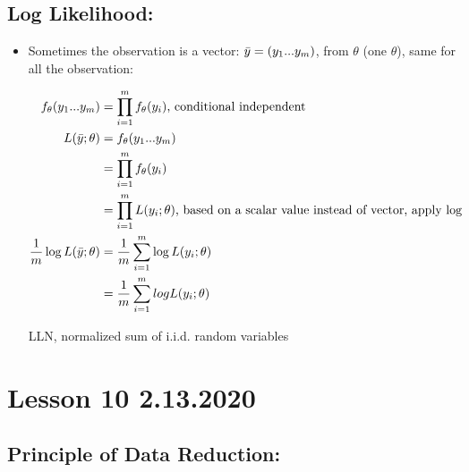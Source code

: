 \documentclass[11pt,letterpaper,titlepage]{article}
\begin{document}
\subsection{Log Likelihood:}

\begin{itemize}
    
    \item Sometimes the observation is a vector: $\Bar{y} = (y_1...y_m)$, from $\theta$ (one $\theta$), same for all the observation:
    
    \begin{equation*}
        \begin{aligned}
            f_{\theta}(y_1...y_m) &= \prod_{i = 1}^{m} f_{\theta}(y_i) \text{, conditional independent} \\
            L(\Bar{y}; \theta) &= f_{\theta}(y_1...y_m) \\
            &= \prod_{i = 1}^{m}f_{\theta}(y_i) \\
            &= \prod_{i = 1}^{m} L(y_i; \theta) \text{, based on a scalar value instead of vector} \text{, apply $\log$} \\
            \frac{1}{m} \log L(\Bar{y}; \theta) &= \frac{1}{m} \sum_{i = 1}^{m} \log L(y_i; \theta) \\
            &= \frac{1}{m} \sum_{i = 1}^{m} log L(y_i; \theta)
        \end{aligned}
    \end{equation*}
    
    LLN, normalized sum of i.i.d. random variables
    
\end{itemize}

\newpage

\section{Lesson 10 2.13.2020}

\subsection{Principle of Data Reduction:}
\end{document}
